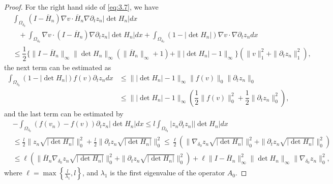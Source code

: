 \documentclass[11pt]{amsart}
\begin{document}
\begin{proof}
For the right hand side of \eqref{eq:3.7}, we have
\begin{align*}
    &\int_{\Omega_{\delta_0}}\left(I-\overline{H}_n\right)\nabla v \cdot \overline{H}_n\nabla \partial_tz_n |\det H_n| dx \\&\;\;\;+\int_{\Omega_{\delta_0}}\nabla v \cdot (I-\overline{H}_n)\nabla  \partial_tz_n |\det H_n|dx+\int_{\Omega_{\delta_0}}(1-|\det H_n|)\nabla v\cdot \nabla \partial_tz_ndx \\
    &\leq \dfrac{1}{2}\Big\{\|I-\overline{H}_n\|_{\infty}\|\det H_n\|_{\infty}\left(\|\overline{H}_n\|_{\infty}+1\right) +\||\det H_n |-1\|_{\infty}\Big\}\left(\|v\|_1^2+\|\partial_t z_n\|_1^2\right),
\end{align*}
the next term can be estimated as
\begin{align*}
    \int_{\Omega_{\delta_0}}(1-|\det H_n|)f(v) \partial_t z_ndx & \leq \||\det H_n |-1\|_{\infty}\|f(v)\|_0\|\partial_tz_n\|_0\\
&\leq \||\det H_n |-1\|_{\infty}\left(\dfrac{1}{2}\|f(v)\|^2_0+\dfrac{1}{2}\|\partial_tz_n\|^2_0\right),
\end{align*}
and the last term can be estimated by
\begin{align*}
    &-\int_{\Omega_{\delta_0}} (f(v_n)-f(v)) \partial_t z_n|\det H_n| dx \leq l \int_{\Omega_{\delta_0}}|z_n \partial_t z_n||\det H_n|dx \\
    &\leq \frac{l}{2}\|z_n \sqrt{|\det H_n|}\|^2_0 +\frac{l}{2}\|\partial_t z_n \sqrt{|\det H_n|}\|^2_0 \leq \frac{\ell}{2}(\|\nabla_{\delta_0} z_n \sqrt{|\det H_n|}\|^2_0 +\|\partial_t z_n \sqrt{|\det H_n|}\|^2_0)\\
    &\leq \ell(\|\overline{H}_n \nabla_{\delta_0}z_n \sqrt{|\det H_n|}\|^2_0+\|\partial_t z_n \sqrt{|\det H_n|}\|^2_0)+\ell \|I - \overline{H}_n\|^2_\infty\|\det H_n\|_{\infty}\|\nabla_{\delta_0}z_n \|_0^2,
\end{align*}
where $\ell = \max\left\{\frac{l}{\lambda_1}, l\right\}$, and $\lambda_1$ is the first eigenvalue of the operator $A_0$. 



\end{proof}
\end{document}
